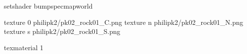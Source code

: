 setshader bumpspecmapworld

texture 0 philipk2/pk02_rock01_C.png
texture n philipk2/pk02_rock01_N.png
texture s philipk2/pk02_rock01_S.png

texmaterial 1
